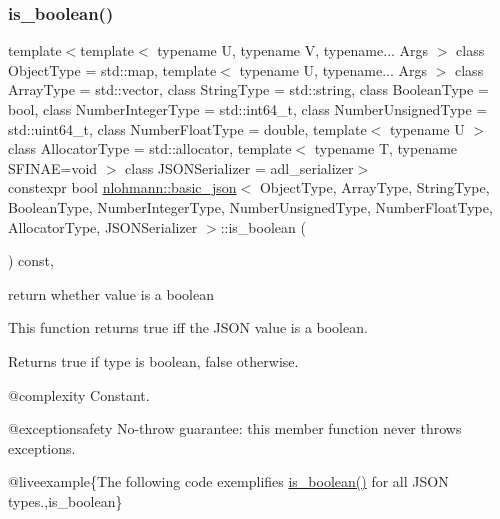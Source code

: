 \subsubsection{\texorpdfstring{is\_boolean()}{is\_boolean()}}
{\footnotesize\ttfamily template$<$template$<$ typename U, typename V, typename... Args $>$ class Object\+Type = std\+::map, template$<$ typename U, typename... Args $>$ class Array\+Type = std\+::vector, class String\+Type  = std\+::string, class Boolean\+Type  = bool, class Number\+Integer\+Type  = std\+::int64\+\_\+t, class Number\+Unsigned\+Type  = std\+::uint64\+\_\+t, class Number\+Float\+Type  = double, template$<$ typename U $>$ class Allocator\+Type = std\+::allocator, template$<$ typename T, typename S\+F\+I\+N\+A\+E=void $>$ class J\+S\+O\+N\+Serializer = adl\+\_\+serializer$>$ \\
constexpr bool \mbox{\hyperlink{classnlohmann_1_1basic__json}{nlohmann\+::basic\+\_\+json}}$<$ Object\+Type, Array\+Type, String\+Type, Boolean\+Type, Number\+Integer\+Type, Number\+Unsigned\+Type, Number\+Float\+Type, Allocator\+Type, J\+S\+O\+N\+Serializer $>$\+::is\+\_\+boolean (\begin{DoxyParamCaption}{ }\end{DoxyParamCaption}) const\hspace{0.3cm}{\ttfamily [inline]}, {\ttfamily [noexcept]}}



return whether value is a boolean 

This function returns true iff the J\+S\+ON value is a boolean.

\begin{DoxyReturn}{Returns}
{\ttfamily true} if type is boolean, {\ttfamily false} otherwise.
\end{DoxyReturn}
@complexity Constant.

@exceptionsafety No-\/throw guarantee\+: this member function never throws exceptions.

@liveexample\{The following code exemplifies {\ttfamily \mbox{\hyperlink{classnlohmann_1_1basic__json_a943e8cb182d0f2365c76d64b42eaa6fd}{is\+\_\+boolean()}}} for all J\+S\+ON types.,is\+\_\+boolean\}

